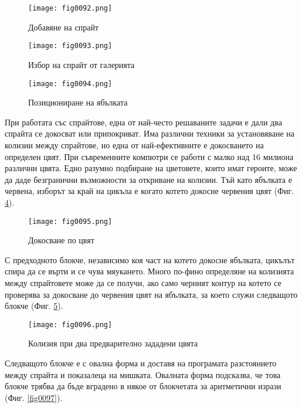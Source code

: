 \begin{figure}[H]
  \centering
  \texttt{[image: fig0092.png]}
  \caption{Добавяне на спрайт}
\label{fig0092}
\end{figure}

\begin{figure}[H]
  \centering
  \texttt{[image: fig0093.png]}
  \caption{Избор на спрайт от галерията}
\label{fig0093}
\end{figure}

\begin{figure}[H]
  \centering
  \texttt{[image: fig0094.png]}
  \caption{Позициониране на ябълката}
\label{fig0094}
\end{figure}

При работата със спрайтове, една от най-често решаваните задачи е дали два спрайта се докосват или припокриват. Има различни техники за установяване на колизии между спрайтове, но една от най-ефективните е докосването на определен цвят. При съвременните компютри се работи с малко над 16 милиона различни цвята. Едно разумно подбиране на цветовете, които имат героите, може да даде безгранични възможности за откриване на колизии. Тъй като ябълката е червена, изборът за край на цикъла е когато котето докосне червения цвят (Фиг. \ref{fig0095}).

\begin{figure}[H]
  \centering
  \texttt{[image: fig0095.png]}
  \caption{Докосване по цвят}
\label{fig0095}
\end{figure}

С предходното блокче, независимо коя част на котето докосне ябълката, цикълът спира да се върти и се чува мяукането. Много по-фино определяне на колизията между спрайтовете може да се получи, ако само черният контур на котето се проверява за докосване до червения цвят на ябълката, за което служи следващото блокче (Фиг. \ref{fig0096}).

\begin{figure}[H]
  \centering
  \texttt{[image: fig0096.png]}
  \caption{Колизия при два предварително зададени цвята}
\label{fig0096}
\end{figure}

Следващото блокче е с овална форма и доставя на програмата разстоянието между спрайта и показалеца на мишката. Овалната форма подсказва, че това блокче трябва да бъде вградено в някое от блокчетата за аритметични изрази (Фиг. \ref{fig0097}).

